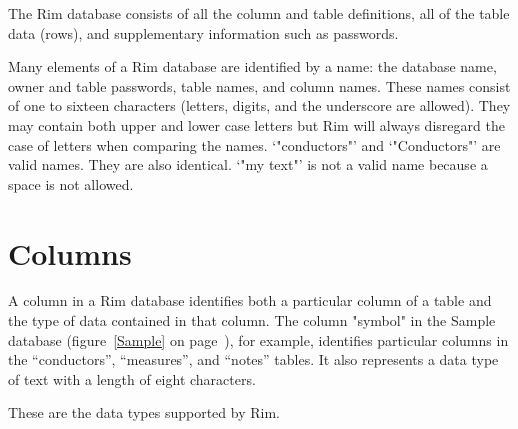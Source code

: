 \documentclass[11pt,a4paper]{report}
\def\I{\index}
\begin{document}
 
The Rim database consists of all the column and table
definitions, all of the table data (rows),
and supplementary information such as passwords.
 
\I{Rim name}
Many elements of a Rim database are identified by a name:
  the database name,
  owner and table passwords,
  table names, and
  column names.
These names consist of one to sixteen
characters (letters, digits, and the underscore are allowed).
They may contain both upper and lower case letters but Rim
will always disregard the case of letters when comparing the names.
`"conductors"' and `"Conductors"' are valid names.  They are also
identical.  `"my text"' is not a valid name because
a space is not allowed.
 
\section{Columns}
\I{column}
A column in a Rim database identifies both a particular
column of a table and the type of data contained in that
column.  The column "symbol" in the Sample database
(figure~\ref{Sample} on page~\pageref{Sample}),
for example, identifies particular
columns in the ``conductors'', ``measures'', and ``notes'' tables.
It also represents a data type of text with a length of
eight characters.
 
These are the data types supported by Rim.
 
\end{document}
